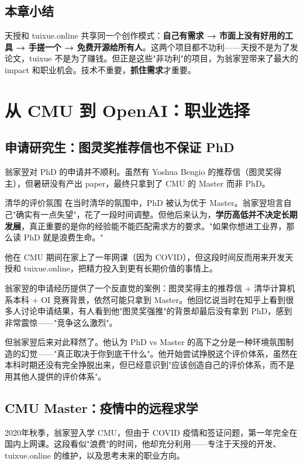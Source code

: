 \documentclass[a4paper]{article}
\begin{document}
\subsection{本章小结}

天授和 tuixue.online 共享同一个创作模式：\textbf{自己有需求 → 市面上没有好用的工具 → 手搓一个 → 免费开源给所有人}。这两个项目都不功利——天授不是为了发论文，tuixue 不是为了赚钱。但正是这些"非功利"的项目，为翁家翌带来了最大的 impact 和职业机会。技术不重要，\textbf{抓住需求}才重要。


\section{从 CMU 到 OpenAI：职业选择}

\subsection{申请研究生：图灵奖推荐信也不保证 PhD}

翁家翌对 PhD 的申请并不顺利。虽然有 Yoshua Bengio 的推荐信（图灵奖得主），但暑研没有产出 paper，最终只拿到了 CMU 的 Master 而非 PhD。

\begin{knowledgebox}{清华的评价氛围}
在当时清华的氛围中，PhD 被认为优于 Master。翁家翌坦言自己"确实有一点失望"，花了一段时间调整。但他后来认为，\textbf{学历高低并不决定长期发展}，真正重要的是你的经验能不能匹配需求方的要求。"如果你想进工业界，那么读 PhD 就是浪费生命。"
\end{knowledgebox}

他在 CMU 期间在家上了一年网课（因为 COVID），但这段时间反而用来开发天授和 tuixue.online，把精力投入到更有长期价值的事情上。

翁家翌的申请经历提供了一个反直觉的案例：图灵奖得主的推荐信 + 清华计算机系本科 + OI 竞赛背景，依然可能只拿到 Master。他回忆说当时在知乎上看到很多人讨论申请结果，有人看到他"图灵奖强推"的背景却最后没有拿到 PhD，感到非常震惊——"竞争这么激烈"。

但翁家翌后来对此释然了。他认为 PhD vs Master 的高下之分是一种环境氛围制造的幻觉——"真正取决于你到底干什么"。他开始尝试挣脱这个评价体系，虽然在本科时期还没有完全挣脱出来，但已经意识到"应该创造自己的评价体系，而不是用其他人提供的评价体系"。

\subsection{CMU Master：疫情中的远程求学}

2020年秋季，翁家翌入学 CMU，但由于 COVID 疫情和签证问题，第一年完全在国内上网课。这段看似"浪费"的时间，他却充分利用——专注于天授的开发、tuixue.online 的维护，以及思考未来的职业方向。
\end{document}
